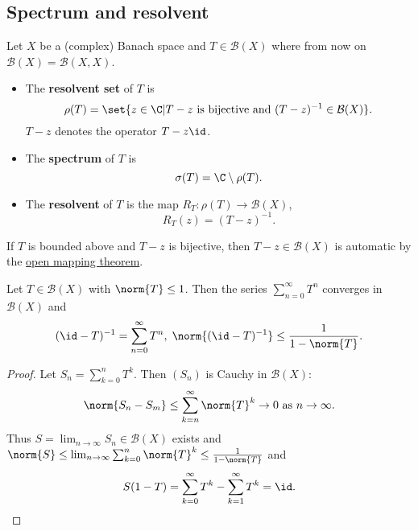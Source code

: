 \documentclass{article}
\begin{document}
\subsection{Spectrum and resolvent}
\begin{defi}
    Let $X$ be a (complex) Banach space and $T \in \mathcal{B}(X)$ where from now on $\mathcal{B}(X) = \mathcal{B}(X, X)$.
    \begin{itemize}
        \item The \textbf{resolvent set} of $T$ is
            \begin{equation*}
                \rho (T) = \set{z \in \C | T - z \text{ is bijective and } (T-z)^{-1} \in \mathcal{B}(X)}.
            \end{equation*}
            $T - z$ denotes the operator $T - z \id$.
        \item The \textbf{spectrum} of $T$ is
            \begin{equation*}
                \sigma(T) = \C \setminus \rho(T).
            \end{equation*}
        \item The \textbf{resolvent} of $T$ is the map $R_T : \rho(T) \to \mathcal{B}(X)$,
            \begin{equation*}
                R_T(z) = (T-z)^{-1}.
            \end{equation*}
    \end{itemize}
\end{defi}

\begin{remark}
    If $T$ is bounded above and $T-z$ is bijective, then $T-z \in \mathcal{B}(X)$ is automatic by the \hyperlink{thm:omt}{open mapping theorem}.
\end{remark}

\begin{fact}
    Let $T \in \mathcal{B}(X)$ with $\norm{T} \leq 1$. Then the series $\sum_{n=0}^\infty T^n$ converges in $\mathcal{B}(X)$ and
    \begin{equation*}
        (\id -T)^{-1} = \sum_{n=0}^\infty T^n, \; \norm{(\id - T)^{-1}} \leq \frac{1}{1 - \norm{T}}.
    \end{equation*}
\end{fact}

\begin{proof}
    Let $S_n = \sum_{k=0}^n T^k$. Then $(S_n)$ is Cauchy in $\mathcal{B}(X)$:
    \begin{equation*}
        \norm{S_n - S_m} \leq \sum_{k=n}^\infty \norm{T}^k \to 0 \text{ as } n \to \infty.
    \end{equation*}
    Thus $S = \lim_{n \to \infty} S_n \in \mathcal{B}(X)$ exists and $\norm{S} \leq \lim_{n \to \infty} \sum_{k=0}^n \norm{T}^k \leq \frac{1}{1 - \norm{T}}$ and
    \begin{equation*}
        S(1-T) = \sum_{k=0}^\infty T^k - \sum_{k=1}^\infty T^k = \id.
    \end{equation*}
\end{proof}
\end{document}
